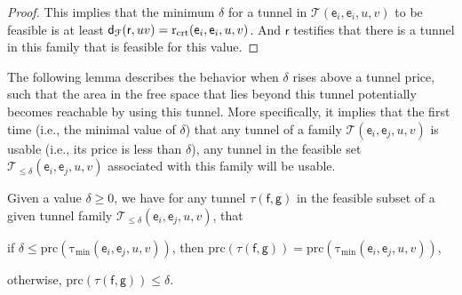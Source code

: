 \documentclass[12pt]{article}
\newcommand{\lemlab}[1]{\label{lemma:#1}}
\newcommand{\distFr}[2]{\mathsf{d}_{\EuScript{F}}\pth{#1, #2}}
\newcommand{\pntB}{\mathsf{r}}
\newcommand{\pntF}{\mathsf{f}}
\newcommand{\pntG}{\mathsf{g}}
\providecommand{\pth}[2][\!]{#1\left({#2}\right)}
\newcommand{\edge}{\mathsf{e}}
\newcommand{\tunnel}{tunnel\xspace}
\newcommand{\tunnelLtr}{\mathsf{\tau}}
\newcommand{\xtunnel}[2]{\tunnelLtr\pth{ #1,  #2}}
\newcommand{\xTunnels}[4]{\mathcal{T}\pth{#1, #2, #3, #4}}
\newcommand{\xTunnelsLeq}[5]{\mathcal{T}_{\leq #5}\pth{#1, #2, #3, #4}}
\newcommand{\scPrice}[2]{{\mathrm{p{r}c}}\pth{\xtunnel{#1}{#2}}}
\newcommand{\rCreate}[4]{\mathrm{r}_{\mathrm{crt}}\pth{#1, #2, #3,#4}}
\newcommand{\bCanonical}[4]{\mathrm{\tau}_{\min}\pth{#1, #2, #3,#4}}
\newcommand{\priceX}[1]{\mathrm{p{r}c}\pth{#1}}
\numberwithin{figure}{section}
\numberwithin{equation}{section}
\begin{document}
\begin{proof}
    This implies that the minimum $\delta$ for a \tunnel in
    $\xTunnels{\edge_i}{\edge_i}{u}{v}$ to be feasible is at least
    $\distFr{\pntB}{uv} = \rCreate{\edge_i}{\edge_i}{u}{v}$.  And
    $\pntB$ testifies that there is a \tunnel in this family that is
    feasible for this value.
\end{proof}

The following lemma describes the behavior when $\delta$ rises above a
\tunnel price, such that the area in the free space that lies beyond
this \tunnel potentially becomes reachable by using this \tunnel. More
specifically, it implies that the first time (i.e., the minimal value
of $\delta$) that any \tunnel of a family
$\xTunnels{\edge_i}{\edge_j}{u}{v}$ is usable (i.e., its price is less
than $\delta$), any \tunnel in the feasible set
$\xTunnelsLeq{\edge_i}{\edge_j}{u}{v}{\delta}$ associated with this
family will be usable.
\begin{lemma}\lemlab{tunnel:event}Given a value $\delta \geq 0$, we have for any \tunnel
    $\xtunnel{\pntF}{\pntG}$ in the feasible subset of a given \tunnel
    family $\xTunnelsLeq{\edge_i}{\edge_j}{u}{v}{\delta}$, that
    \begin{compactenum}[(i)]
        \item if $\delta \leq
        \priceX{\bCanonical{\edge_i}{\edge_j}{u}{v}}$, then
        $\scPrice{\pntF}{\pntG} =
        \priceX{\bCanonical{\edge_i}{\edge_j}{u}{v}}$,
        
        \item otherwise, $\scPrice{\pntF}{\pntG} \leq \delta$.
    \end{compactenum}
\end{lemma}
\end{document}
